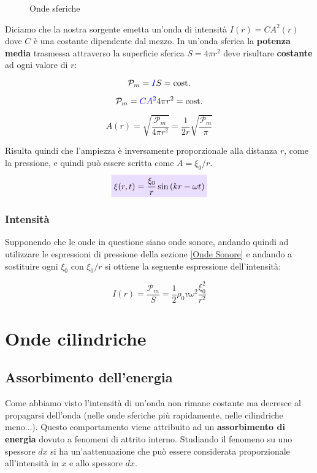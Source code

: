 \documentclass[x11names]{report}
\newcommand{\incfig}[1]{%
	\def\svgwidth{\columnwidth}
	{#1.pdf_tex}
}
\newcommand{\viola}[1]{\colorbox{yred}{$\displaystyle #1$}}
\begin{document}
	\begin{figure}[ht]
		\centering
		\scalebox{.7}{\incfig{sfera}}
		\caption{Onde sferiche}
		\label{fig:Onde sferiche}
	\end{figure}
	
	\noindent
	Diciamo che la nostra sorgente emetta un'onda di intensità \(I(r) = CA^2(r)\) dove \(C\) è una costante dipendente dal mezzo. In un'onda sferica la \textbf{potenza media} trasmessa attraverso la superficie sferica \(S = 4\pi r^2\) deve risultare \textbf{costante} ad ogni valore di \(r\):
	
	\[ 
	\mathcal{P}_m = \textcolor{blue}{I}S = \text{cost.}
	\] 
	
	\[ 
	\mathcal{P}_m = \textcolor{blue}{CA^2}4\pi r^2 = \text{cost.}
	\]
	
	\[ 
	A(r) = \sqrt{\frac{\mathcal{P}_m}{4\pi r^2}} = \frac{1}{2r}\sqrt{\frac{\mathcal{P}_m}{\pi}}
	\]

	\noindent
	Risulta quindi che l'ampiezza è inversamente proporzionale alla distanza \(r\), come la pressione, e quindi può essere scritta come \(A = \xi_0 /r\).
	\begin{equation}
		\viola{\xi(r,t) = \frac{\xi_0}{r}\sin\left(kr -\omega t\right)}
	\end{equation}
	
	\subsubsection{Intensità}
	Supponendo che le onde in questione siano onde sonore, andando quindi ad utilizzare le espressioni di pressione della sezione \ref{Onde Sonore} e andando a sostituire ogni \(\xi_0\) con \(\xi_0/r\) si ottiene la seguente espressione dell'intensità:
	
	\[ 
	I(r) = \frac{\mathcal{P}_m}{S} = \frac{1}{2} \rho_0 v \omega ^2 \frac{\xi_0^2}{r^2}
	\]
	
	\section{Onde cilindriche}
	


	\newpage
	\subsection{Assorbimento dell'energia}
	Come abbiamo visto l'intensità di un'onda non rimane costante ma decresce al propagarsi dell'onda (nelle onde sferiche più rapidamente, nelle cilindriche meno...). Questo comportamento viene attribuito ad un \textbf{assorbimento di energia} dovuto a fenomeni di attrito interno. Studiando il fenomeno su uno spessore \(dx\) si ha un'aattenuazione che può essere considerata proporzionale all'intensità in \(x\) e allo spessore \(dx\).
	
\end{document}
